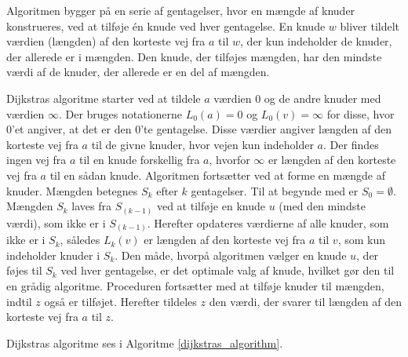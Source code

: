 Algoritmen bygger på en serie af gentagelser, hvor en mængde af knuder konstrueres, ved at tilføje én knude ved hver gentagelse. 
En knude $w$ bliver tildelt værdien (længden) af den korteste vej fra $a$ til $w$, der kun indeholder de knuder, der allerede er i mængden. 
Den knude, der tilføjes mængden, har den mindste værdi af de knuder, der allerede er en del af mængden.

Dijkstras algoritme starter ved at tildele $a$ værdien $0$ og de andre knuder med værdien $\infty$. 
Der bruges notationerne $L_0(a)=0$ og $L_0(v)= \infty$ for disse, hvor $0$’et angiver, at det er den $0$'te gentagelse. 
Disse værdier angiver længden af den korteste vej fra $a$ til de givne knuder, hvor vejen kun indeholder $a$. 
Der findes ingen vej fra $a$ til en knude forskellig fra $a$, hvorfor $\infty$ er længden af den korteste vej fra $a$ til en sådan knude.
Algoritmen fortsætter ved at forme en mængde af knuder. Mængden betegnes $S_k$ efter $k$ gentagelser. 
Til at begynde med er $S_0=\emptyset$. 
Mængden $S_k$ laves fra $S_(k-1)$ ved at tilføje en knude $u$ (med den mindste værdi), som ikke er i $S_(k-1)$.
Herefter opdateres værdierne af alle knuder, som ikke er i $S_k$, således $L_k(v)$ er længden af den korteste vej fra $a$ til $v$, som kun indeholder knuder i $S_k$. 
Den måde, hvorpå algoritmen vælger en knude $u$, der føjes til $S_k$ ved hver gentagelse, er det optimale valg af knude, hvilket gør den til en grådig algoritme. 
Proceduren fortsætter med at tilføje knuder til mængden, indtil $z$ også er tilføjet.
Herefter tildeles $z$ den værdi, der svarer til længden af den korteste vej fra $a$ til $z$.

Dijkstras algoritme ses i Algoritme \ref{dijkstras_algorithm}.

